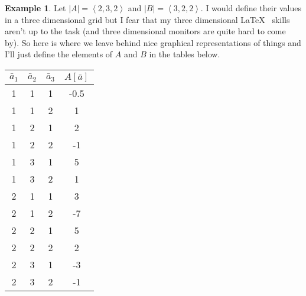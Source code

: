 \documentclass[12pt]{book}
\theoremstyle{plain}
\theoremstyle{definition}
\newtheorem{example}{Example}[chapter]
\theoremstyle{ppart}
\theoremstyle{case}
\theoremstyle{solution}
\newcommand{\shape}[1]{\left|#1\right|}
\begin{document}
\newpage
\begin{example}
Let $\shape{A} = \left<2, 3, 2\right>$ and $\shape{B} = \left<3, 2, 2\right>$. I would
define their values in a three dimensional grid but I fear that my three dimensional
\LaTeX~ skills aren't up to the task (and three dimensional monitors are quite hard to
come by). So here is where we leave behind nice graphical representations of
things and I'll just define the elements of $A$ and $B$ in the tables below.
\begin{table}[h!]
\begin{center}
\begin{tabular}{c c c | c}
$\bar{a}_1$ & $\bar{a}_2$ & $\bar{a}_3$ & $A[\bar{a}]$ \\
\hline
1           & 1           & 1           & -0.5         \\
1           & 1           & 2           & 1            \\
1           & 2           & 1           & 2            \\
1           & 2           & 2           & -1           \\
1           & 3           & 1           & 5            \\
1           & 3           & 2           & 1            \\
2           & 1           & 1           & 3            \\
2           & 1           & 2           & -7           \\
2           & 2           & 1           & 5            \\
2           & 2           & 2           & 2            \\
2           & 3           & 1           & -3           \\
2           & 3           & 2           & -1
\end{tabular}
\end{center}
\end{table}


\end{example}
\end{document}
